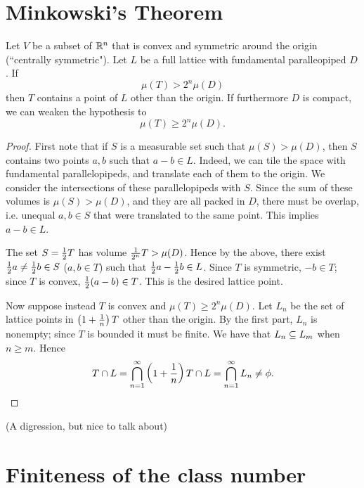 \section{Minkowski's Theorem}
\begin{thm}[Minkowski]
Let $V$ be a subset of $\mathbb{R}^n$ that is convex and symmetric around the origin (``centrally symmetric"). %
Let $L$ be a full lattice with fundamental paralleopiped $D$. 
If
\[
\mu(T) > 2^n \mu(D)
\]
then $T$ contains a point of $L$ other than the origin. If furthermore $D$ is compact, we can weaken the hypothesis to
\[
\mu(T)\ge 2^n\mu(D).
\]
\end{thm}
\begin{proof}
First note that if $S$ is a measurable set such that $\mu(S)>\mu(D)$, then $S$ contains two points $a,b$ such that $a-b\in L$. Indeed, we can tile the space with fundamental parallelopipeds, and translate each of them to the origin. We consider the intersections of these parallelopipeds with $S$. 
Since the sum of these volumes is $\mu(S)>\mu(D)$, and they are all packed in $D$, there must be overlap, i.e. unequal $a,b\in S$ that were translated to the same point. This implies $a-b\in L$.

The set $S=\frac{1}{2}T$ has volume $\frac{1}{2^n}T>\mu(D)$. Hence by the above, there exist $\frac{1}{2} a\ne \frac{1}{2} b\in S$ ($a,b\in T$) such that $\frac{1}{2}a-\frac{1}{2}b\in L$. Since $T$ is symmetric, $-b\in T$; since $T$ is convex, $\frac{1}{2} (a-b)\in T$. This is the desired lattice point.

Now suppose instead $T$ is convex and $\mu(T)\ge 2^n\mu(D)$. Let $L_n$ be the set of lattice points in $\left( {1+\frac{1}{n}} \right)T$ other than the origin. By the first part, $L_n$ is nonempty; since $T$ is bounded it must be finite. We have that $L_n\subseteq L_m$ when $n\ge m$. Hence \[T\cap L=\bigcap_{n=1}^{\infty} \left( {1+\frac{1}{n}} \right)T \cap L=\bigcap_{n=1}^{\infty} L_n\ne \phi.\qedhere\]
\end{proof}
\begin{thm}
(A digression, but nice to talk about)
\end{thm}
\section{Finiteness of the class number}

